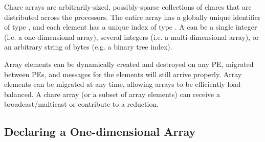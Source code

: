 \label{basic arrays}

Chare arrays are
arbitrarily-sized, possibly-sparse collections of chares that are distributed
across the processors. The entire array has a globally unique identifier of
type , and each element has a unique index of type
. A  can be a single integer (i.e. a one-dimensional array),
several integers (i.e. a multi-dimensional array), or an arbitrary string of
bytes (e.g. a binary tree index).

Array elements can be dynamically created and destroyed on any PE,
migrated between PEs, and messages for the elements will still arrive
properly. Array elements can be migrated at any time, allowing arrays to be
efficiently load balanced. A chare array (or a subset of array elements) can
receive a broadcast/multicast or contribute to a reduction.

\subsection{Declaring a One-dimensional Array}

